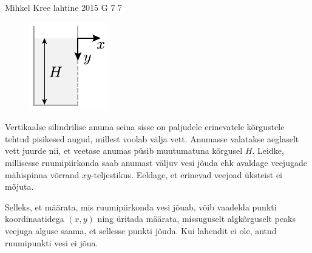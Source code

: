 {Mihkel Kree} %
{lahtine} %
{2015} %
{G 7} %
{7} %
{
\ifStatement
\begin{figure}%
\vspace{-15pt}
\includegraphics[width=\linewidth]{2015-lahg-07-veejoadJoon}%
\end{figure}
Vertikaalse silindrilise anuma seina sisse on paljudele erinevatele kõrgustele tehtud pisikesed augud, millest voolab välja vett. Anumasse valatakse aeglaselt vett juurde nii, et veetase anumas püsib muutumatuna kõrgusel $H$. Leidke, millisesse ruumipiirkonda saab anumast väljuv vesi jõuda ehk avaldage veejugade mähispinna võrrand $xy$-teljestikus. Eeldage, et erinevad veejoad üksteist ei mõjuta.
\fi


\ifHint
Selleks, et määrata, mis ruumipiirkonda vesi jõuab, võib vaadelda punkti koordinaatidega $(x, y)$ ning üritada määrata, missuguselt algkõrguselt peaks veejuga alguse saama, et sellesse punkti jõuda. Kui lahendit ei ole, antud ruumipunkti vesi ei jõua.
\fi


}
